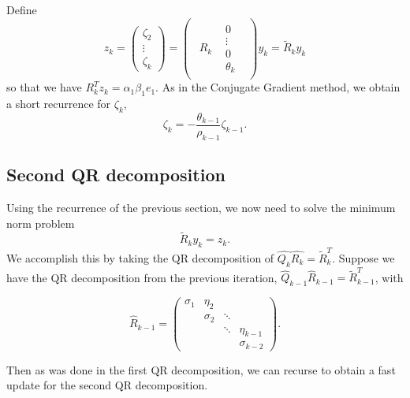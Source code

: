 \documentclass[11pt]{article}
\newcommand{\hQ}{\hat{Q}}
\begin{document}
Define
\begin{equation}
z_k = \begin{pmatrix}
\zeta_2 \\ \vdots \\ \zeta_{k}
\end{pmatrix} = \begin{pmatrix}\begin{array}{c|c}
 R_{k} &  \begin{matrix} 0 \\ \vdots \\ 0  \\ \theta_{k} \end{matrix} 
\end{array}\end{pmatrix} y_k = \tilde{R}_k y_k
\end{equation}
so that we have $R^T_k z_k = \alpha_1 \beta_1 e_1$.
As in the Conjugate Gradient method, we obtain a short recurrence for $\zeta_k$,
\begin{equation}
\zeta_k = -\frac{\theta_{k-1}}{\rho_{k-1}} \zeta_{k-1}.
\end{equation}

\subsection{Second QR decomposition}
Using the recurrence of the previous section, we now need to solve the minimum norm problem
$$ \tilde{R}_k y_k = z_k. $$
We accomplish this by taking the QR decomposition of $\hat{Q_k}\hat{R_k} = \tilde{R}^T_k$. Suppose we have the QR decomposition from the previous iteration, $\hQ_{k-1}\hat{R}_{k-1} = \tilde{R}^T_{k-1}$, with

\begin{equation*}
\hat{R}_{k-1} = \begin{pmatrix}
\sigma_1 & \eta_2 & & \\
& \sigma_2 & \ddots & \\
& & \ddots & \eta_{k-1} \\
& & & \sigma_{k-2}
\end{pmatrix}.
\end{equation*}

Then as was done in the first QR decomposition, we can recurse to obtain a fast update for the second QR decomposition.
\end{document}
